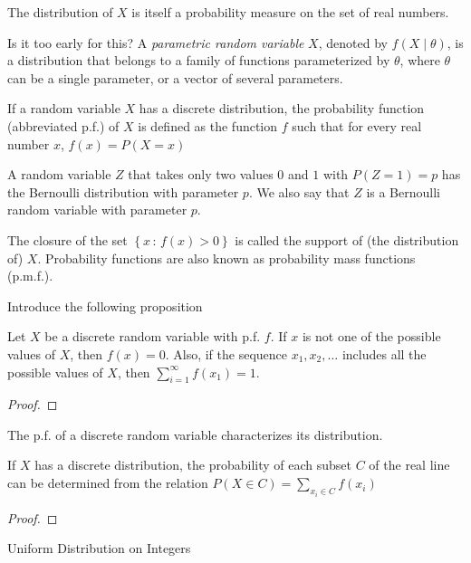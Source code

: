 {\color{red} The distribution of $X$ is itself a probability measure on the set of real numbers.}

{\color{red} Is it too early for this?} A \emph{parametric random variable} $X$, denoted by $f\left(X \mid \theta \right)$, is a distribution that belongs to a family of functions parameterized by $\theta$, where $\theta$ can be a single parameter, or a vector of several parameters. 

{\color{red} If a random variable $X$ has a discrete distribution, the probability function (abbreviated p.f.) of $X$ is defined as the function $f$ such that for every real number $x$, $f\left(x\right)=P\left(X=x\right)$}

\begin{example}
A random variable $Z$ that takes only two values $0$ and $1$ with $P\left(Z=1\right)=p$ has the Bernoulli distribution with parameter $p$. We also say that $Z$ is a Bernoulli random variable with parameter $p$.
\end{example}

{\color{red} The closure of the set $\left\{ x\,:\,f\left(x\right)>0\right\}$  is called the support of (the distribution of) $X$. Probability functions are also known as probability mass functions (p.m.f.).}

{\color{red} Introduce the following proposition}

\begin{proposition}
Let $X$ be a discrete random variable with p.f. $f$. If $x$ is not one of the possible values of $X$, then $f\left(x\right)=0$. Also, if the sequence $x_{1},x_{2},\ldots$ includes all the possible values of $X$, then $\sum_{i=1}^{\infty}f\left(x_{1}\right)=1$.
\end{proposition}
\begin{proof}
\end{proof}

{\color{red} The p.f. of a discrete random variable characterizes its distribution.}

\begin{proposition}
If $X$ has a discrete distribution, the probability of each subset $C$ of the real line can be determined from the relation $P\left(X\in C\right)=\sum_{x_{i}\in C}f\left(x_{i}\right)$
\end{proposition}
\begin{proof}
\end{proof}

{\color{red} Uniform Distribution on Integers}

